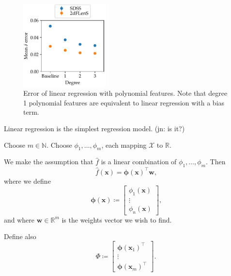 \documentclass[11pt,twoside,openright]{report}
\newcommand\bphi{\bm{\phi}}
\newcommand\bbN{\mathbb{N}}
\newcommand\bbR{\mathbb{R}}
\newcommand\bw{\mathbf{w}}
\newcommand\bx{\mathbf{x}}
\newcommand\cX{\mathcal{X}}
\newcommand\jn[1]{{\color{red}(jn: #1)}}
\begin{document}
  \begin{figure}
    \centering
    \includegraphics[width=0.4\textwidth]{linreg_polynomial.pdf}
    \caption{Error of linear regression with polynomial features. Note that degree 1 polynomial features are equivalent to linear regression with a bias term.}
    \label{fig:linreg_polynomial}
  \end{figure}

Linear regression is the simplest regression model. \jn{is it?}

Choose $m \in \bbN$. Choose $\phi_1, \dots, \phi_m$, each mapping $\cX$ to $\bbR$.

We make the assumption that $\hat f$ is a linear combination of $\phi_1, \dots, \phi_m$. Then \[
    \hat f(\bx) = \bphi(\bx)^\top \bw \text{,}
\] where we define \[
    \bphi(\bx) \coloneqq \begin{bmatrix} \phi_1(\bx) \\ \vdots \\ \phi_n(\bx) \end{bmatrix}\text{,}
\] and where $\bw \in \bbR^m$ is the weights vector we wish to find.

Define also\[
    \Phi \coloneqq \begin{bmatrix}
        \bphi(\bx_1)^\top \\
        \vdots \\
        \bphi(\bx_m)^\top
    \end{bmatrix} \text{.}
\]
\end{document}
